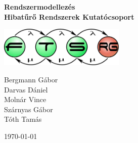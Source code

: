 \begin{titlepage}
\begin{center}
\vspace*{5cm}

{\huge \bfseries Rendszermodellezés}\\[0.8cm]

{\Large \bfseries Hibatűrő Rendszerek Kutatócsoport}\\[0.8cm]

\vspace{1cm}

\includegraphics[width=60mm,keepaspectratio]{figures/ftsrg-logo}\\

\vfill

Bergmann Gábor \\
Darvas Dániel \\
Molnár Vince \\
Szárnyas Gábor \\
Tóth Tamás

\vfill

{\large \today}

\vspace{3cm}
\end{center}
\end{titlepage}
